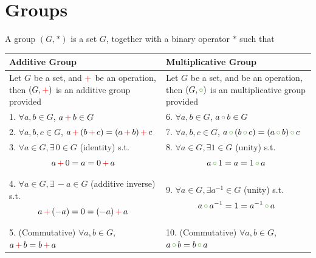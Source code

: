 \chapter{Groups}

\begin{definition}
    A group $(G, *)$ is a set $G$, together with a binary operator $*$ such that 
\end{definition}

\begin{center}
    {
    \renewcommand{\arraystretch}{2}
    \begin{tabular}{| m{20em} | m{20em} |}
        \hline
        Additive Group & Multiplicative Group\\
        \hline
        Let $G$ be a set, and ${\color{red} +}$ be an operation, 
        then $(G, {\color{red} +})$ is an additive group provided & 
        Let $G$ be a set, and  be an operation, 
        then $(G, {\color{extinctGreen} \circ})$ is an multiplicative group provided\\[1em]
        \hline
        1. $\forall a, b \in G$, $a \, {\color{red} +}\, b \in G$ & 
        6. $\forall a, b \in G$, $a \,{\color{extinctGreen} \circ}\, b \in G$\\[1em]
        \hline
        2. $\forall a, b, c \in G$, $a \, {\color{red} +}\, (b \, {\color{red} +}\, c ) = (a \, {\color{red} +}\, b) \, {\color{red} +}\, c $ & 
        7. $\forall a, b, c \in G$, $a \, {\color{extinctGreen} \circ}\, (b \, {\color{extinctGreen} \circ}\, c ) = (a \, {\color{extinctGreen} \circ}\, b) \, {\color{extinctGreen} \circ}\, c $\\[1em]
        \hline
        3. $\forall a \in G, \exists\, 0 \in G $ (identity) s.t. 
            \[a \, {\color{red} +} \, 0 = a = 0 \, {\color{red} +}\, a\] & 
        8. $\forall a \in G, \exists 1 \in G $ (unity) s.t. \[a \, {\color{extinctGreen} \circ}\, 1 = a = 1 \, {\color{extinctGreen} \circ} \, a\]\\[1em] 
        \hline
        
        4. $\forall a \in G, \exists\, -a \in G $ (additive inverse) s.t. 
            \[a \, {\color{red} +}\, (-a) = 0 = (-a)\, {\color{red} +}\, a\] & 
        9. $\forall a \in G, \exists a^{-1} \in G $ (unity) s.t. \[a \, {\color{extinctGreen} \circ}\, a^{-1} = 1 = a^{-1} \, {\color{extinctGreen} \circ}\, a\]\\[1em]
        \hline
        5. (Commutative) $\forall a, b \in G$, $a \, {\color{red} +}\, b = b \, {\color{red} +}\, a$ &
        10. (Commutative) $\forall a, b \in G$, $a \, {\color{extinctGreen} \circ}\, b = b \, {\color{extinctGreen} \circ}\, a$\\[1em]
        \hline
    \end{tabular}
    }
\end{center}

